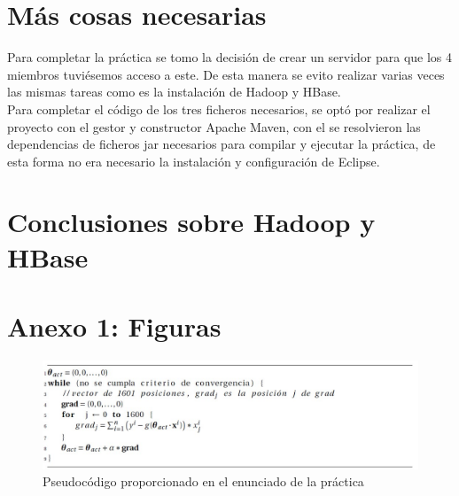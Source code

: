 \documentclass[11pt,a4paper]{article}
\begin{document}
\label{listing:enunciado}

\section{Más cosas necesarias}
Para completar la práctica se tomo la decisión de crear un servidor para que los 4 miembros tuviésemos acceso a este. De esta manera se evito realizar varias veces las mismas tareas como es la instalación de Hadoop y HBase. \\
Para completar el código de los tres ficheros necesarios, se optó por realizar el proyecto con el gestor y constructor  Apache Maven, con el se resolvieron las dependencias de ficheros jar necesarios para compilar y ejecutar la práctica, de esta forma no era necesario la instalación y configuración de Eclipse.
\section{Conclusiones sobre Hadoop y HBase}

\newpage
\section{Anexo 1: Figuras}

\begin{figure}[h!]
\centering
\includegraphics[scale=0.75]{images/pseudocodigo_enunciado.jpg}
\caption{Pseudocódigo proporcionado en el enunciado de la práctica}
\label{fig:pseudoenunciado}
\end{figure}
\end{document}
